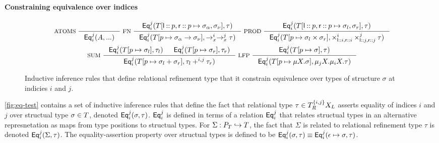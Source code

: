 \paragraph{Constraining equivalence over indices}

\begin{figure}
  \centering
  \begin{gather*}
    \inference[ ATOMS ]{ }{ \iseq{i}{j}(A, ...) } 
    \inference[ FN ]{ 
      \iseq{i}{j}(\upd{ T }{ %
        \leftchild \cons p, \rightchild \cons p }{ %
        \sigma_{\alpha}, \sigma_{\nu} }, %
      \tau) }{
      \iseq{i}{j}(\upd{ T }{ p }{ \sigma_{\alpha} \to \sigma_{\nu} }, %
      \to^i_x \to^j_x \tau) } 
    \inference[ PROD ]{
      \iseq{i}{j}(\upd{ T }{ %
        \leftchild \cons p, \rightchild \cons p }{ %
        \sigma_l, \sigma_r }, %
      \tau) }{
      \iseq{i}{j}(\upd{ T }{ p }{ \sigma_l \times \sigma_r }, %
      \times_{ \leftchild \cons i, \rightchild \cons i }^{i} %
      \times_{ \leftchild \cons j, \rightchild \cons j }^{j} \tau) } \\
    \inference[ SUM ]{
      \iseq{i}{j}(\upd{ T }{ p }{ \sigma_l }, \tau_l) &
      \iseq{i}{j}(\upd{ T }{ p }{ \sigma_r }, \tau_r) }{
      \iseq{i}{j}(\upd{ T }{ p }{ \sigma_l + \sigma_r }, %
      \tau_l +^{i, j} \tau_r) } 
    \inference[ LFP ]{
      \iseq{i}{j}(\upd{ T }{ p }{ \sigma },  \tau) }{
      \iseq{i}{j}(\upd{ T }{ p }{ \mu X. \sigma }, %
      \mu_j X. \mu_i X. \tau) }
  \end{gather*}
  \caption{Inductive inference rules that define relational refinement type that it constrain equivalence over types of structure $\sigma$ at indicies $i$ and $j$.
     }
  \label{fig:eq-test}
\end{figure}

\autoref{fig:eq-test} contains a set of inductive inference rules that
define the fact that relational type
$\tau \in T_{R}^{ \{ i, j \} }{ X_L }$ asserts equality of
indices $i$ and $j$ over structual type $\sigma \in T$, denoted
$\mathsf{Eq}_{i}^{j}(\sigma, \tau)$.
%
$\mathsf{Eq}_{i}^{j}$ is defined in terms of a relation $\mathsf{Eq}_{i}^{j}$ that
relates structual types in an alternative represnetation as maps from
type positions to structual types.
%
For $\Sigma: P_T \hookrightarrow T$, the fact that $\Sigma$ is related
to relational refinement type $\tau$ is denoted
$\mathsf{Eq}_{i}^{j}(\Sigma, \tau)$.
%
The equality-assertion property over structual types is defined to be
$\mathsf{Eq}_{i}^{j}(\sigma, \tau) \equiv \mathsf{Eq}_{i}^{j}(\epsilon \mapsto \sigma,
\tau)$.


